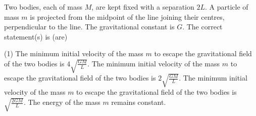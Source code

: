 
\item Two bodies, each of mass \( M \), are kept fixed with a separation \( 2L \). A particle of mass \( m \) is projected from the midpoint of the line joining their centres, perpendicular to the line. The gravitational constant is \( G \). The correct statement(s) is (are)
    \begin{tasks}(1)
        \task The minimum initial velocity of the mass \( m \) to escape the gravitational field of the two bodies is \( 4\sqrt{\frac{GM}{L}} \).
        \task The minimum initial velocity of the mass \( m \) to escape the gravitational field of the two bodies is \( 2\sqrt{\frac{GM}{L}} \).
        \task The minimum initial velocity of the mass \( m \) to escape the gravitational field of the two bodies is \( \sqrt{\frac{2GM}{L}} \).
        \task The energy of the mass \( m \) remains constant.
    \end{tasks}
